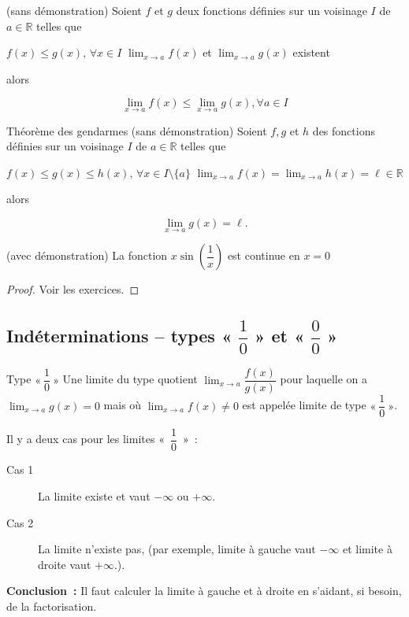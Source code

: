 \documentclass[a4paper,12pt]{article}
\begin{document}
\begin{thm}
	(sans démonstration)
	\tcblower
	Soient $f$ et $g$ deux fonctions définies sur un voisinage $I$ de $a\in \mathbb{R}$ telles que  
	\begin{tasks}
		\task $f(x)\leq g(x),\, \forall x \in I$
		\task $\displaystyle{\lim_{x\rightarrow a}f(x)}$ et $\displaystyle{\lim_{x\rightarrow a}g(x)}$ existent  
	\end{tasks} alors 

	\[\displaystyle{\lim_{x\rightarrow a}f(x)}\leq  \displaystyle{\lim_{x\rightarrow a}g(x)}, \forall a\in I\]

\end{thm}
\begin{thm}
	Théorème des gendarmes
	(sans démonstration)
	\tcblower
	Soient $f, g$ et $h$ des fonctions définies sur un voisinage $I$ de $a\in \mathbb{R}$ %
	telles que
	\begin{tasks}
		\task $f(x)\leq g(x)\leq h(x),\, \forall x \in I\setminus\{a\}$
		\task $\displaystyle{\lim_{x\rightarrow a}f(x)}=\displaystyle{\lim_{x\rightarrow a}h(x)}=\ell\in \mathbb{R}$ 

	\end{tasks} alors 

	\[\displaystyle{\lim_{x\rightarrow a}g(x)}=\ell.\]
\end{thm}
\begin{coro}
(avec démonstration)
	\tcblower 
	La fonction $x\sin\left(\dfrac{1}{x}\right)$ est continue en $x=0$
	\begin{proof}
Voir les exercices. 
	\end{proof}
	
\end{coro}
\subsection{Indéterminations -- types « $\dfrac{1}{0}$ » et « $\dfrac{0}{0}$ »}
\begin{definition}
	Type $«~\dfrac{1}{0}~»$
	\tcblower
	Une limite du type quotient \(\displaystyle \lim_{x\to a}\dfrac{f(x)}{g(x)}\) pour laquelle on a \(\displaystyle \lim_{x\to a}g(x)=0\) mais où \(\displaystyle \lim_{x\to a}f(x)\neq0\) est appelée limite de type \(«~\displaystyle \dfrac{1}{0}~»\). 
\end{definition}
\begin{remarque}
	\tcblower
	Il y a deux cas pour les limites «~$\dfrac{1}{0}$~»~:
	\begin{description}
		\item[Cas 1] La limite existe et vaut $-\infty$ ou $+\infty$.
		\item[Cas 2] La limite n'existe pas, (par exemple, limite à gauche vaut $-\infty$ et limite à droite vaut $+\infty$.).
	\end{description}
	{\bfseries Conclusion~:} Il faut calculer la limite à gauche et à droite en s'aidant, si besoin, de la factorisation.
\end{remarque}
\end{document}
